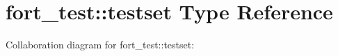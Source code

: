 \hypertarget{structfort__test_1_1testset}{}\section{fort\+\_\+test\+:\+:testset Type Reference}
\label{structfort__test_1_1testset}


Collaboration diagram for fort\+\_\+test\+:\+:testset\+:
